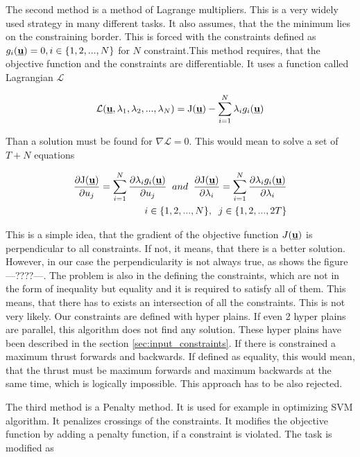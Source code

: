 \documentclass{article}
\newcommand{\Lagr}{\mathcal{L}}
\newcommand{\uvec}{\textbf{\underline{u}}}
\begin{document}
The second method is a method of Lagrange multipliers. This is a very widely used strategy in many different tasks. It also assumes, that the the minimum lies on the constraining border. This is forced with the constraints defined as $g_i(\uvec) = 0, i \in \{1, 2, ..., N\}$ for $N$ constraint.This method requires, that the objective function and the constraints are differentiable. It uses a function called Lagrangian $\Lagr$

\begin{equation}
\label{Lagrangian}
\Lagr(\uvec, \lambda_1, \lambda_2, ..., \lambda_N) = \mathrm{J}(\uvec) - \sum_{i = 1}^N \lambda_i g_i(\uvec)
\end{equation}

Than a solution must be found for $\nabla \Lagr = 0$. This would mean to solve a set of $T + N$ equations 

\begin{equation}
\label{Lagrangian}
\begin{split}
\frac{\partial \mathrm{J(\uvec)}}{\partial u_j} =  \sum_{i = 1}^N \frac{\partial \lambda_i g_i(\uvec) }{\partial u_j} \;\; and \;\;\frac{\partial \mathrm{J(\uvec)}}{\partial \lambda_i} =  \sum_{i = 1}^N \frac{\partial \lambda_i g_i(\uvec) }{\partial \lambda_i}\\
i \in \{1, 2, ..., N\},\;\;j \in \{1, 2, ..., 2T\}
\end{split}
\end{equation}

This is a simple idea, that the gradient of the objective function $J(\uvec)$ is perpendicular to all constraints. If not, it means, that there is a better solution. However, in our case the perpendicularity is not always true, as shows the figure ---????---. The problem is also in the defining the constraints, which are not in the form of inequality but equality and it is required to satisfy all of them. This means, that there has to exists an intersection of all the constraints. This is not very likely. Our constraints are defined with hyper plains. If even 2 hyper plains are parallel, this algorithm does not find any solution. These hyper plains have been described in the section \ref{sec:input_constraints}. If there is constrained a maximum thrust forwards and backwards. If defined as equality, this would mean, that the thrust must be maximum forwards and maximum backwards at the same time, which is logically impossible. This approach has to be also rejected.

The third method is a Penalty method. It is used for example in optimizing SVM algorithm. It penalizes crossings of the constraints. It modifies the objective function by adding a penalty function, if a constraint is violated. The task is modified as 
\end{document}
